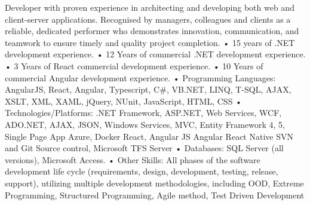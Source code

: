 

\begin{cvparagraph}

Developer with proven experience in architecting and developing both web and client-server applications. Recognised by managers, colleagues and clients as a reliable, dedicated performer who demonstrates innovation, communication, and teamwork to ensure timely and quality project completion.
•	15 years of .NET development experience.
•	12 Years of commercial .NET development experience.
•	3 Years of React commercial development experience.
•	10 Years of commercial Angular development experience. 
•	Programming Languages: AngularJS, React, Angular, Typescript, C\#, VB.NET, LINQ, T-SQL, AJAX, XSLT, XML, XAML, jQuery, NUnit, JavaScript, HTML, CSS
•	Technologies/Platforms:
.NET Framework, ASP.NET, Web Services, WCF, ADO.NET, AJAX, JSON, Windows Services, MVC,
 Entity Framework 4, 5, Single Page App
Azure, Docker
React,
Angular JS
Angular
React Native 
SVN and Git Source control, Microsoft TFS Server
•	Databases: SQL Server (all versions), Microsoft Access.  
•	Other Skills:  All phases of the software development life cycle (requirements, design, development, testing, release, support), utilizing multiple development methodologies, including OOD, Extreme Programming, Structured Programming, Agile method, Test Driven Development 

\end{cvparagraph}
